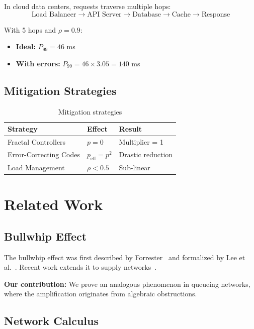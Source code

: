 \documentclass[11pt]{article}
\begin{document}
In cloud data centers, requests traverse multiple hops:
$$\text{Load Balancer} \to \text{API Server} \to \text{Database} \to \text{Cache} \to \text{Response}$$

With 5 hops and $\rho = 0.9$:
\begin{itemize}
    \item \textbf{Ideal:} $P_{99} = 46$ ms
    \item \textbf{With errors:} $P_{99} = 46 \times 3.05 = 140$ ms
\end{itemize}

\subsection{Mitigation Strategies}

\begin{table}[h]
\centering
\caption{Mitigation strategies}
\begin{tabular}{lll}
\toprule
Strategy & Effect & Result \\
\midrule
Fractal Controllers & $p = 0$ & Multiplier = 1 \\
Error-Correcting Codes & $p_{\text{eff}} = p^2$ & Drastic reduction \\
Load Management & $\rho < 0.5$ & Sub-linear \\
\bottomrule
\end{tabular}
\end{table}

\section{Related Work}

\subsection{Bullwhip Effect}

The bullwhip effect was first described by Forrester~\cite{forrester1958industrial} and formalized by Lee et al.~\cite{lee1997bullwhip}. Recent work extends it to supply networks~\cite{osadchiy2021bullwhip,yu2022bullwhip}.

\textbf{Our contribution:} We prove an analogous phenomenon in queueing networks, where the amplification originates from algebraic obstructions.

\subsection{Network Calculus}
\end{document}
